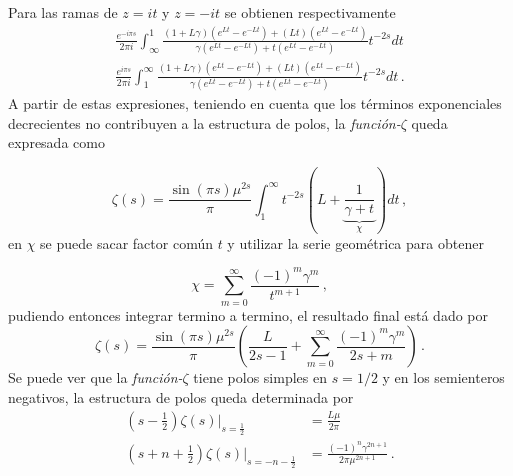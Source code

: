Para las ramas de $z= i t$ y $z=- i t$ se obtienen respectivamente
\begin{equation}\label{eq.tirados}
\begin{aligned}
\frac{e ^{-i \pi s}}{2 \pi i} \int _{\infty} ^{1} 
	\frac{(1+L \gamma) \left( e^{L t} - e ^{- L t} \right) +
			(L t) \left( e ^{L t} - e^{- L t} \right)
			}
			{\gamma \left( e ^{L t} - e ^{- L t} \right) + 
			t \left( e ^{L t} - e ^{-L t} \right)}
			t ^{-2s} dt \\[7pt]
\frac{e ^{i \pi s}}{2 \pi i} \int _{1} ^{\infty} 
	\frac{(1+L \gamma) \left( e^{L t} - e ^{- L t} \right) +
			(L t) \left( e ^{L t} - e^{- L t} \right)
			}
			{\gamma \left( e ^{L t} - e ^{- L t} \right) + 
			t \left( e ^{L t} - e ^{-L t} \right)}
			t ^{-2s} dt
			\, .
\end{aligned}
\end{equation}
A partir de estas expresiones, teniendo en cuenta que los términos exponenciales decrecientes no contribuyen a la estructura de polos, la {\it función-$\zeta$} queda expresada como

\begin{equation}
	\zeta  (s) = 
    \frac{ \sin (\pi s) \mu ^{2s}}{ \pi } 
    \int _1 ^{\infty} 
    t^{-2s}
    \left(
    	L + 
	    \underbrace
    	{
		\frac{1}{\gamma + t}   
		} _{\chi} 
	\right)
    dt  \,  ,
\label{contorno}
\end{equation}
en $\chi$ se puede sacar factor común $t$ y utilizar la serie geométrica para obtener

\begin{equation}
    \chi =   \sum _{m=0} ^{\infty} \frac{(-1) ^{m} \gamma ^{m} }{t ^{m+1}}
    \, ,
\label{eq:chi}
\end{equation}
pudiendo entonces integrar termino a termino, el resultado final está dado por
\begin{equation}\label{eq.seta}
    \zeta  (s) = 
    \frac{ \sin(\pi s) \mu ^{2s }}{\pi } 
    \left(
    \frac{L}{2s-1} + 
    \sum _{m=0} ^{\infty}
    \frac{(-1) ^{m} \gamma ^{m} }{2s+m}
    \right) \, .
\end{equation}
Se puede ver que la {\it función-$\zeta$} tiene polos simples en $s=1/2$ y en los semienteros negativos, la estructura de polos queda determinada por
\begin{equation}
\begin{aligned}
\left(s-\frac{1}{2} \right) \zeta(s) |_{s=\frac{1}{2}} &= \frac{L \mu }{2 \pi}   \\
\left( s + n + \frac{1}{2} \right)
\zeta (s ) |_{s= -n - \frac{1}{2}}  &= \frac{ (-1) ^n \gamma ^{2n+1}  }{2 \pi \mu ^{2n + 1}} 
\, .
\end{aligned}
\label{eq.polos.complejo}
\end{equation}


